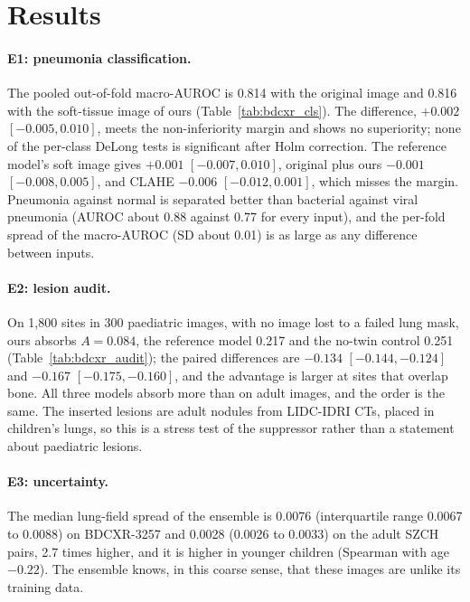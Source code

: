 \section{Results}
\paragraph{E1: pneumonia classification.} The pooled out-of-fold macro-AUROC is 0.814 with the original image and 0.816 with the soft-tissue
image of ours (Table~\ref{tab:bdcxr_cls}). The difference, $+0.002$ $[-0.005,0.010]$, meets the non-inferiority margin and shows no superiority;
none of the per-class DeLong tests is significant after Holm correction. The reference model's soft image gives $+0.001$ $[-0.007,0.010]$,
original plus ours $-0.001$ $[-0.008,0.005]$, and CLAHE $-0.006$ $[-0.012,0.001]$, which misses the margin. Pneumonia against normal is
separated better than bacterial against viral pneumonia (AUROC about 0.88 against 0.77 for every input), and the per-fold spread of the
macro-AUROC (SD about 0.01) is as large as any difference between inputs.

\paragraph{E2: lesion audit.} On 1,800 sites in 300 paediatric images, with no image lost to a failed lung mask, ours absorbs $A=0.084$, the
reference model 0.217 and the no-twin control 0.251 (Table~\ref{tab:bdcxr_audit}); the paired differences are $-0.134$ $[-0.144,-0.124]$ and
$-0.167$ $[-0.175,-0.160]$, and the advantage is larger at sites that overlap bone. All three models absorb more than on adult images, and the
order is the same. The inserted lesions are adult nodules from LIDC-IDRI CTs, placed in children's lungs, so this is a stress test of the
suppressor rather than a statement about paediatric lesions.

\paragraph{E3: uncertainty.} The median lung-field spread of the ensemble is 0.0076 (interquartile range 0.0067 to 0.0088) on BDCXR-3257 and
0.0028 (0.0026 to 0.0033) on the adult SZCH pairs, 2.7 times higher, and it is higher in younger children (Spearman with age $-0.22$). The
ensemble knows, in this coarse sense, that these images are unlike its training data.
\begin{table}[htbp]
\centering\small
\caption{BDCXR-3257: pneumonia classification (normal, bacterial, viral), five folds over near-duplicate groups $\times$ three seeds; pooled
out-of-fold macro-AUROC, per-fold mean $\pm$ SD and the difference to the original image (group bootstrap).}
\label{tab:bdcxr_cls}
\end{table}
\begin{table}[htbp]
\centering\small
\caption{BDCXR-3257: lesion audit on a fixed class-stratified subset of 300 images (1,800 sites).}
\label{tab:bdcxr_audit}
\end{table}

